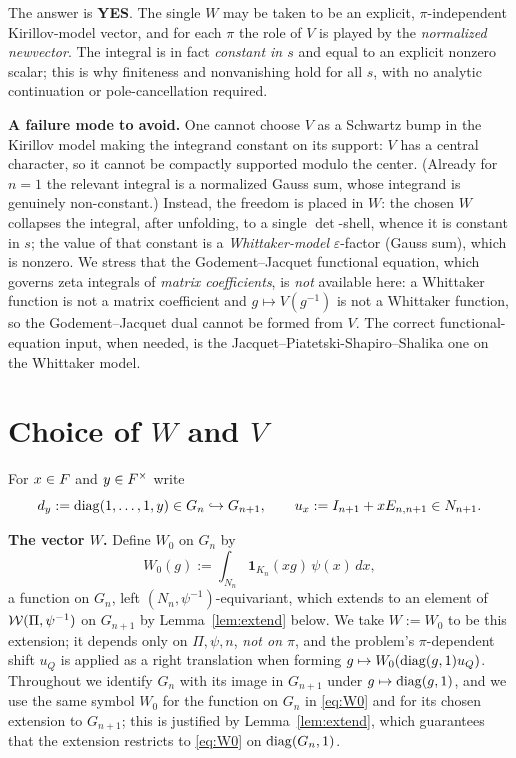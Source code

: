 \medskip
\noindent The answer is \textbf{YES}. The single $W$ may be taken to be an
explicit, $\pi$-independent Kirillov-model vector, and for each $\pi$
the role of $V$ is played by the \emph{normalized newvector}. The integral is in
fact \emph{constant in $s$} and equal to an explicit nonzero scalar; this is why
finiteness and nonvanishing hold for all $s$, with no analytic continuation or
pole-cancellation required.

\medskip
\noindent\textbf{A failure mode to avoid.} One cannot choose $V$ as a
Schwartz bump in the Kirillov model making the integrand constant on its
support: $V$ has a central character, so it cannot be compactly supported modulo
the center. (Already for $n=1$ the relevant integral is a normalized Gauss sum,
whose integrand is genuinely non-constant.) Instead, the freedom is placed in
$W$: the chosen $W$ collapses the integral, after unfolding, to a single
$\det$-shell, whence it is constant in $s$; the value of that constant is a
\emph{Whittaker-model} $\varepsilon$-factor \textup{(}Gauss sum\textup{)}, which
is nonzero. We stress that the Godement--Jacquet functional equation, which
governs zeta integrals of \emph{matrix coefficients}, is \emph{not} available
here: a Whittaker function is not a matrix coefficient and $g\mapsto V(g^{-1})$
is not a Whittaker function, so the Godement--Jacquet dual cannot be formed from
$V$. The correct functional-equation input, when needed, is the
Jacquet--Piatetski-Shapiro--Shalika one on the Whittaker model.

\section*{Choice of $W$ and $V$}

For $x\in F$ and $y\in F^\times$ write
\[
d_y:=\operatorname{diag}(1,\dots,1,y)\in G_n\hookrightarrow G_{n+1},\qquad
u_x:=I_{n+1}+xE_{n,n+1}\in N_{n+1}.
\]

\noindent\textbf{The vector $W$.} Define $W_0$ on $G_n$ by
\begin{equation}\label{eq:W0}
W_0(g):=\int_{N_n}\mathbf 1_{K_n}(xg)\,\psi(x)\,dx,
\end{equation}
a function on $G_n$, left $(N_n,\psi^{-1})$-equivariant, which extends to an element of
$\mathcal{W}(\Pi,\psi^{-1})$ on $G_{n+1}$ by Lemma~\ref{lem:extend} below. We take
$W:=W_0$ to be this extension; it depends only on $\Pi,\psi,n$, \emph{not on $\pi$}, and the
problem's $\pi$-dependent shift $u_Q$ is applied as a right translation when forming
$g\mapsto W_0(\operatorname{diag}(g,1)u_Q)$. Throughout we identify $G_n$
with its image in $G_{n+1}$ under $g\mapsto\operatorname{diag}(g,1)$, and we use the same symbol
$W_0$ for the function on $G_n$ in \eqref{eq:W0} and for its chosen extension to
$G_{n+1}$; this is justified by Lemma~\ref{lem:extend}, which guarantees that the
extension restricts to \eqref{eq:W0} on $\operatorname{diag}(G_n,1)$.

